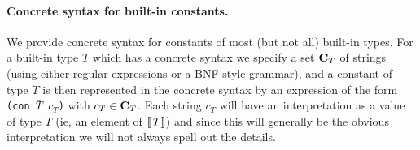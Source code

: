 \paragraph{Concrete syntax for built-in constants.}
We provide concrete syntax for constants of most (but not all) built-in types.
For a built-in type $T$ which has a concrete syntax we specify a set $\mathbf{C}_T$
of strings (using either regular expressions or a BNF-style grammar), and a
constant of type $T$ is then represented in the concrete syntax by an expression
of the form \texttt{(con $\bar{T}$ $c_T$)} with $c_T \in \mathbf{C}_T$.  Each string
$c_T$ will have an interpretation as a value of type $T$ (ie, an element of
$\llbracket\mathit{T}\rrbracket$) and since this will generally be the obvious interpretation we
will not always spell out the details.%





\newpage %





